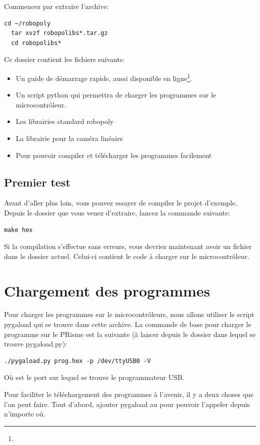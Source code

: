 Commencez par extraire l'archive:
\begin{lstlisting}[style=console]
  cd ~/robopoly
  tar xvzf robopolibs*.tar.gz
  cd robopolibs*
\end{lstlisting}

Ce dossier contient les fichiers suivants:
\begin{itemize}
  \item {} Un guide de démarrage rapide, aussi disponible en
    ligne\footnote{\urlreadme{}}.
  \item {} Un script python qui permettra de charger les
    programmes sur le microcontrôleur.
  \item {} Les librairies standard robopoly
  \item {} La librairie pour la caméra linéaire
  \item {} Pour pouvoir compiler et télécharger les programmes
    facilement
\end{itemize}

\subsection{Premier test}
Avant d'aller plus loin, vous pouvez essayer de compiler le projet d'exemple.
Depuis le dossier que vous venez d'extraire, lancez la commande suivante:
\begin{lstlisting}[style=console]
  make hex 
\end{lstlisting}
Si la compilation s'effectue sans erreurs, vous devriez maintenant avoir un
fichier  dans le dossier actuel. Celui-ci contient le code à
charger sur le microcontrôleur.

\section{Chargement des programmes}
Pour charger les programmes sur le microcontrôleurs, nous allons utiliser le
script pygaload qui se trouve dans cette archive. La commande de base pour
charger le programme  sur le PRisme est la suivante (à lancer depuis
le dossier dans lequel se trouve pygaload.py):
\begin{lstlisting}[style=console]
  ./pygaload.py prog.hex -p /dev/ttyUSB0 -V
\end{lstlisting}
Où  est le port sur lequel se trouve le programmateur USB.

Pour faciliter le téléchargement des programmes à l'avenir, il y a deux choses
que l'on peut faire. Tout d'abord, ajouter pygaload au  pour pouvoir
l'appeler depuis n'importe où.

